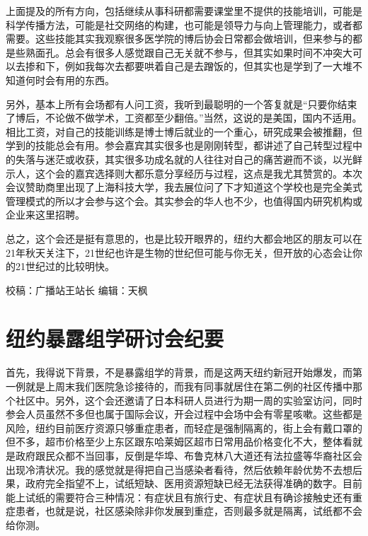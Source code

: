 \documentclass[
]{book}
\begin{document}
上面提及的所有方向，包括继续从事科研都需要课堂里不提供的技能培训，可能是科学传播方法，可能是社交网络的构建，也可能是领导力与向上管理能力，或者都需要。这些技能其实我观察很多医学院的博后协会日常都会做培训，但来参与的都是些熟面孔。总会有很多人感觉跟自己无关就不参与，但其实如果时间不冲突大可以去掺和下，例如我每次去都要哄着自己是去蹭饭的，但其实也是学到了一大堆不知道何时会有用的东西。

另外，基本上所有会场都有人问工资，我听到最聪明的一个答复就是``只要你结束了博后，不论做不做学术，工资都至少翻倍。''当然，这说的是美国，国内不适用。相比工资，对自己的技能训练是博士博后就业的一个重心，研究成果会被推翻，但学到的技能总会有用。参会嘉宾其实很多也是刚刚转型，都讲述了自己转型过程中的失落与迷茫或收获，其实很多功成名就的人往往对自己的痛苦避而不谈，以光鲜示人，这个会的嘉宾选择则大都乐意分享经历与过程，这点是我尤其赞赏的。本次会议赞助商里出现了上海科技大学，我去展位问了下才知道这个学校也是完全美式管理模式的所以才会参与这个会。其实参会的华人也不少，也值得国内研究机构或企业来这里招聘。

总之，这个会还是挺有意思的，也是比较开眼界的，纽约大都会地区的朋友可以在21年秋天关注下，21世纪也许是生物的世纪但可能与你无关，但开放的心态会让你的21世纪过的比较明快。

校稿：广播站王站长
编辑：天枫

\hypertarget{ux7ebdux7ea6ux66b4ux9732ux7ec4ux5b66ux7814ux8ba8ux4f1aux7eaaux8981}{%
\section{纽约暴露组学研讨会纪要}\label{ux7ebdux7ea6ux66b4ux9732ux7ec4ux5b66ux7814ux8ba8ux4f1aux7eaaux8981}}

首先，我得说下背景，不是暴露组学的背景，而是这两天纽约新冠开始爆发，而第一例就是上周末我们医院急诊接待的，而我有同事就居住在第二例的社区传播中那个社区中。另外，这个会还邀请了日本科研人员进行为期一周的实验室访问，同时参会人员虽然不多但也属于国际会议，开会过程中会场中会有零星咳嗽。这些都是风险，纽约目前医疗资源只够重症患者，而轻症是强制隔离的，街上会有戴口罩的但不多，超市价格至少上东区跟东哈莱姆区超市日常用品价格变化不大，整体看就是政府跟民众都不当回事，反倒是华埠、布鲁克林八大道还有法拉盛等华裔社区会出现冷清状况。我的感觉就是得把自己当感染者看待，然后依赖年龄优势不去想后果，政府完全指望不上，试纸短缺、医用资源短缺已经无法获得准确的数字。目前能上试纸的需要符合三种情况：有症状且有旅行史、有症状且有确诊接触史还有重症患者，也就是说，社区感染除非你发展到重症，否则最多就是隔离，试纸都不会给你测。
\end{document}
